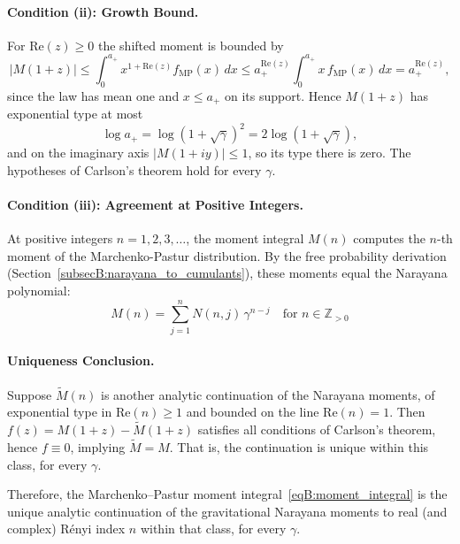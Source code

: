 \documentclass[11pt,letterpaper]{article}
\theoremstyle{plain}
\theoremstyle{definition}
\theoremstyle{remark}
\begin{document}
\paragraph{Condition (ii): Growth Bound.}

For $\mathrm{Re}(z) \ge 0$ the shifted moment is bounded by
\begin{equation}
|M(1+z)| \leq \int_{0}^{a_+} x^{1 + \mathrm{Re}(z)} f_{\mathrm{MP}}(x) \, dx \leq a_+^{\mathrm{Re}(z)} \int_0^{a_+} x\, f_{\mathrm{MP}}(x)\, dx = a_+^{\mathrm{Re}(z)} ,
\label{eqB:moment_bound}
\end{equation}
since the law has mean one and $x \leq a_+$ on its support. Hence $M(1+z)$ has exponential type at most
\begin{equation}
\log a_+ = \log(1 + \sqrt{\gamma})^2 = 2\log(1 + \sqrt{\gamma}),
\label{eqB:exponential_type}
\end{equation}
and on the imaginary axis $|M(1+iy)| \le 1$, so its type there is zero. The hypotheses of Carlson's theorem hold for every $\gamma$.

\paragraph{Condition (iii): Agreement at Positive Integers.}

At positive integers $n = 1, 2, 3, \ldots$, the moment integral $M(n)$ computes the $n$-th moment of the Marchenko-Pastur distribution. By the free probability derivation (Section~\ref{subsecB:narayana_to_cumulants}), these moments equal the Narayana polynomial:
\begin{equation}
M(n) = \sum_{j=1}^{n} N(n, j) \, \gamma^{n-j} \quad \text{for } n \in \mathbb{Z}_{> 0}
\end{equation}

\paragraph{Uniqueness Conclusion.}

Suppose $\tilde{M}(n)$ is another analytic continuation of the Narayana moments, of exponential type in $\mathrm{Re}(n) \ge 1$ and bounded on the line $\mathrm{Re}(n) = 1$. Then $f(z) = M(1+z) - \tilde{M}(1+z)$ satisfies all conditions of Carlson's theorem, hence $f \equiv 0$, implying $\tilde{M} = M$. That is, the continuation is unique within this class, for every $\gamma$.

Therefore, the Marchenko--Pastur moment integral~\eqref{eqB:moment_integral} is the unique analytic continuation of the gravitational Narayana moments to real (and complex) R\'enyi index $n$ within that class, for every $\gamma$.
\end{document}
